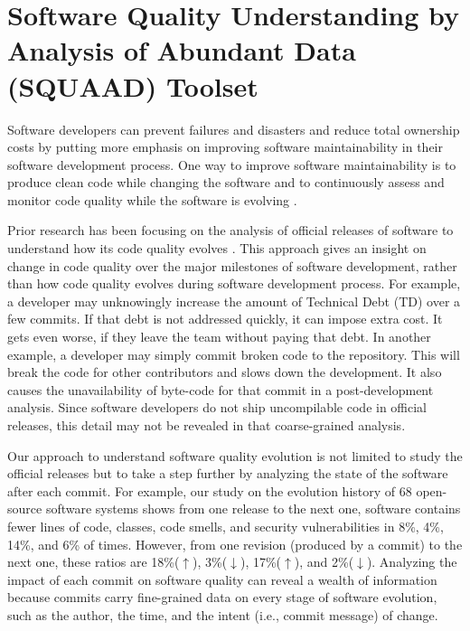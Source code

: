 \section{Software Quality Understanding by Analysis of Abundant Data (SQUAAD) Toolset}
\label{sec:squaad}

Software developers can prevent failures and disasters and reduce total ownership costs by putting more emphasis on improving software maintainability in their software development process.
One way to improve software maintainability is to produce clean code while changing the software and to continuously assess and monitor code quality while the software is evolving \cite {mexim2015introduction}.

Prior research has been focusing on the analysis of official releases of software to understand how its code quality evolves \cite{PINTO201559,tu2000evolution,ganpati2012comparative,d2008analysing,le2015empirical}.
This approach gives an insight on change in code quality over the major milestones of software development, rather than how code quality evolves during software development process. 
For example, a developer may unknowingly increase the amount of Technical Debt (TD) over a few commits. If that debt is not addressed quickly, it can impose extra cost.
It gets even worse, if they leave the team without paying that debt.
In another example, a developer may simply commit broken code to the repository.
This will break the code for other contributors and slows down the development.
It also causes the unavailability of byte-code for that commit in a post-development analysis.
Since software developers do not ship uncompilable code in official releases, this detail may not be revealed in that coarse-grained analysis. 

Our approach to understand software quality evolution is not limited to study the official releases but to take a step further by analyzing the state of the software after each commit.
For example, our study on the evolution history of  68 open-source software systems shows from one release to the next one, software contains fewer lines of code, classes, code smells, and security vulnerabilities in 8\%, 4\%, 14\%, and 6\% of times.
However, from one revision (produced by a commit) to the next one, these ratios are 18\%($\uparrow$), 3\%($\downarrow$), 17\%($\uparrow$), and 2\%($\downarrow$).
Analyzing the impact of each commit on software quality can reveal a wealth of information because commits carry fine-grained data on every stage of software evolution, such as the author, the time, and the intent (i.e., commit message) of change.


